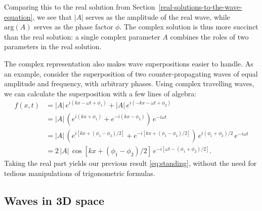 \documentclass[10pt,a4paper]{article}
\begin{document}
Comparing this to the real solution from
Section~\ref{real-solutions-to-the-wave-equation}, we see that $|A|$
serves as the amplitude of the real wave, while $\mathrm{arg}(A)$
serves as the phase factor $\phi$. The complex solution is thus more
succinct than the real solution: a single complex parameter $A$
combines the roles of two parameters in the real solution.

The complex representation also makes wave superpositions easier to
handle. As an example, consider the superposition of two
counter-propagating waves of equal amplitude and frequency, with
arbitrary phases. Using complex travelling waves, we can calculate the
superposition with a few lines of algebra:
\begin{align}
  f(x,t) &= |A| \, e^{i(kx - \omega t + \phi_1)} + |A| \, e^{i(-kx - \omega t + \phi_2)} \\
  &=  |A|\, \left(e^{i(kx + \phi_1)} + e^{-i(kx - \phi_2)}\right)\, e^{-i\omega t} \\
  &= |A|\, \left(e^{i[kx + (\phi_1-\phi_2)/2]} + e^{-i[kx + (\phi_1 - \phi_2)/2]}\right)\, e^{i(\phi_1 + \phi_2)/2} \,e^{-i\omega t} \\
  &= \displaystyle 2\,|A|\, \cos\left[kx + (\phi_1-\phi_2)/2\right] \,e^{-i[\omega t -(\phi_1+\phi_2)/2]}.
\end{align}
Taking the real part yields our previous result \eqref{eq:standing},
without the need for tedious manipulations of trigonometric formulas.

\subsection{Waves in 3D space}
\label{waves-in-3d-space}
\end{document}
